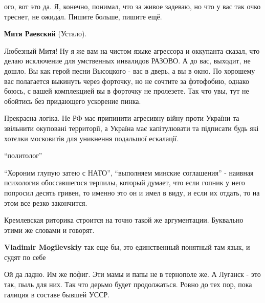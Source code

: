 \begin{itemize}
\begin{itemize}
ого, вот это да. Я, конечно, понимал, что за живое задеваю, но что у вас так
очко треснет, не ожидал. Пишите больше, пишите ещё.


\textbf{Митя Раевский} (Устало). 

Любезный Митя! Ну я же вам на чистом языке агрессора и оккупанта сказал, что
делаю исключение для умственных инвалидов РАЗОВО. А до вас, выходит, не дошло.
Вы как герой песни Высоцкого - вас в дверь, а вы в окно. По хорошему вас
полагается выкинуть через форточку, но не сочтите за фэтофобию, однако боюсь, с
вашей комплекцией вы в форточку не пролезете. Так что увы, тут не обойтись без
придающего ускорение пинка.

\end{itemize} %


Прекрасна логіка. Не РФ має припинити агресивну війну проти України та
звільнити окуповані территорії, а Україна має капітулювати та підписати будь
які хотєлки московитів для уникнення подальшої ескалації.

\enquote{политолог}


\enquote{Хороним глупую затею с НАТО}, \enquote{выполняем минские соглашения} -
наивная психология обоссавшегося терпилы, который думает, что если гопник у
него попросил десять гривен, то именно это он и имел в виду, и если их отдать,
то на этом все резко закончится.

\begin{itemize} %

Кремлевская риторика строится на точно такой же аргументации. Буквально этими
же словами и говорят.

\textbf{Vladimir Mogilevskiy} так еще бы, это единственный понятный там язык, и судят по себе
\end{itemize} %


Ой да ладно. Им же пофиг. Эти мамы и папы не в тернополе же. А Луганск - это
так, пыль для них.  Так что дерьмо будет продолжаться. Ровно до тех пор, пока
галиция в составе бывшей УССР.

\end{itemize} %
